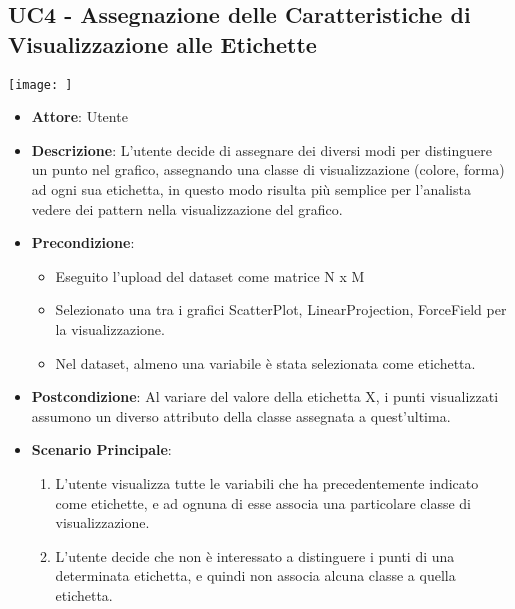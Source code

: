     \subsection{UC4 - Assegnazione delle Caratteristiche di Visualizzazione alle Etichette}
    \texttt{[image: ]}
    \begin{itemize}
    \item \textbf{Attore}: Utente
    \item \textbf{Descrizione}: L'utente decide di assegnare dei diversi modi per distinguere un punto nel grafico, assegnando una classe di visualizzazione (colore, forma) ad ogni sua etichetta, in questo modo risulta più semplice per l'analista vedere dei pattern nella visualizzazione del grafico.
    \item \textbf{Precondizione}:
    \begin{itemize}
        \item Eseguito l'upload del dataset come matrice N x M
        \item Selezionato una tra i grafici ScatterPlot, LinearProjection, ForceField per la visualizzazione.
        \item Nel dataset, almeno una variabile è stata selezionata come etichetta.
    \end{itemize}
    \item \textbf{Postcondizione}: Al variare del valore della etichetta X, i punti visualizzati assumono un diverso attributo della classe assegnata a quest'ultima.
    \item \textbf{Scenario Principale}: 
    \begin{enumerate}
        \item L'utente visualizza tutte le variabili che ha precedentemente indicato come etichette, e ad ognuna di esse associa una particolare classe di visualizzazione. 
        \item L'utente decide che non è interessato a distinguere i punti di una determinata etichetta, e quindi non associa alcuna classe a quella etichetta.
    \end{enumerate}  
    \end{itemize}
    
